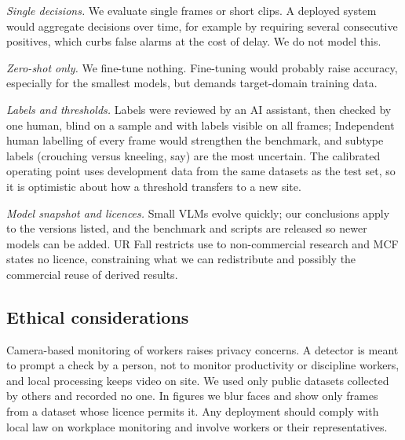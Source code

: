 \textit{Single decisions.} We evaluate single frames or short clips. A deployed system would aggregate decisions over time, for example by requiring several consecutive positives, which curbs false alarms at the cost of delay. We do not model this.

\textit{Zero-shot only.} We fine-tune nothing. Fine-tuning would probably raise accuracy, especially for the smallest models, but demands target-domain training data.

\textit{Labels and thresholds.} Labels were reviewed by an AI assistant, then checked by one human, blind on a sample and with labels visible on all frames; \HumanCheckText{} Independent human labelling of every frame would strengthen the benchmark, and subtype labels (crouching versus kneeling, say) are the most uncertain. The calibrated operating point uses development data from the same datasets as the test set, so it is optimistic about how a threshold transfers to a new site.

\textit{Model snapshot and licences.} Small VLMs evolve quickly; our conclusions apply to the versions listed, and the benchmark and scripts are released so newer models can be added. UR Fall restricts use to non-commercial research and MCF states no licence, constraining what we can redistribute and possibly the commercial reuse of derived results.

\subsection{Ethical considerations}
Camera-based monitoring of workers raises privacy concerns. A \pd{} detector is meant to prompt a check by a person, not to monitor productivity or discipline workers, and local processing keeps video on site. We used only public datasets collected by others and recorded no one. In figures we blur faces and show only frames from a dataset whose licence permits it. Any deployment should comply with local law on workplace monitoring and involve workers or their representatives.
